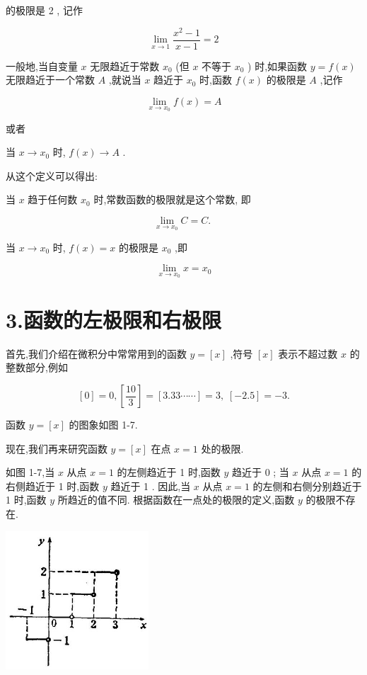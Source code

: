 \documentclass[lang=cn,newtx,10pt,scheme=chinese]{elegantbook}
\begin{document}
的极限是 2 , 记作

\[
\mathop{\lim }\limits_{{x \rightarrow 1}}\frac{{x}^{2} - 1}{x - 1} = 2
\]

一般地,当自变量 \(x\) 无限趋近于常数 \({x}_{0}\) (但 \(x\) 不等于 \({x}_{0}\) ) 时,如果函数 \(y = f\left( x\right)\) 无限趋近于一个常数 \(A\) ,就说当 \(x\) 趋近于 \({x}_{0}\) 时,函数 \(f\left( x\right)\) 的极限是 \(A\) ,记作

\[
\mathop{\lim }\limits_{{x \rightarrow {x}_{0}}}f\left( x\right) = A
\]

或者

当 \(x \rightarrow {x}_{0}\) 时, \(f\left( x\right) \rightarrow A\) .

从这个定义可以得出:

当 \(x\) 趋于任何数 \({x}_{0}\) 时,常数函数的极限就是这个常数, 即

\[
\mathop{\lim }\limits_{{x \rightarrow {x}_{0}}}C = C\text{. }
\]

当 \(x \rightarrow {x}_{0}\) 时, \(f\left( x\right) = x\) 的极限是 \({x}_{0}\) ,即

\[
\mathop{\lim }\limits_{{x \rightarrow {x}_{0}}}x = {x}_{0}
\]

\section*{3.函数的左极限和右极限}

首先,我们介绍在微积分中常常用到的函数 \(y = \left\lbrack x\right\rbrack\) ,符号 \(\left\lbrack x\right\rbrack\) 表示不超过数 \(x\) 的整数部分,例如

\[
\left\lbrack 0\right\rbrack = 0,\left\lbrack \frac{10}{3}\right\rbrack = \left\lbrack {{3.33}\cdots \cdots }\right\rbrack = 3,\;\left\lbrack {-{2.5}}\right\rbrack = - 3.
\]

函数 \(y = \left\lbrack x\right\rbrack\) 的图象如图 1-7.

现在,我们再来研究函数 \(y = \left\lbrack x\right\rbrack\) 在点 \(x = 1\) 处的极限.

如图 1-7,当 \(x\) 从点 \(x = 1\) 的左侧趋近于 1 时,函数 \(y\) 趋近于 0 ; 当 \(x\) 从点 \(x = 1\) 的右侧趋近于 1 时,函数 \(y\) 趋近于 1 . 因此,当 \(x\) 从点 \(x = 1\) 的左侧和右侧分别趋近于 1 时,函数 \(y\) 所趋近的值不同. 根据函数在一点处的极限的定义,函数 \(y\) 的极限不存在.

\begin{center}
	\includegraphics[max width=0.4\textwidth]{images/01912c18-5c3f-733d-b775-749ba9897a9d_25_214056.jpg}
\end{center}
\end{document}
